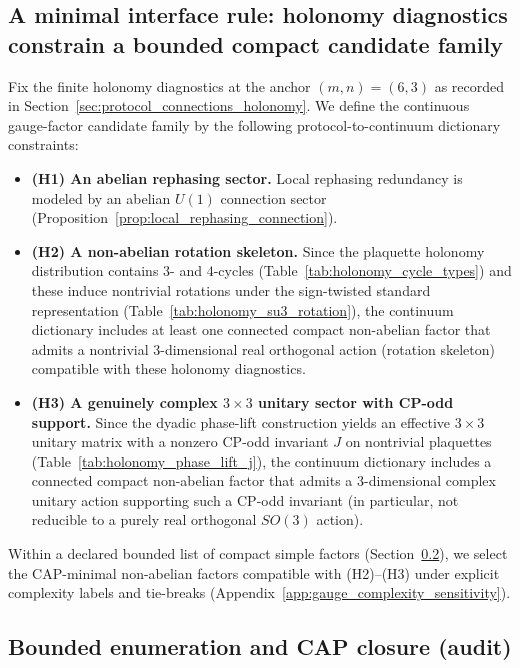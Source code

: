 \subsection{A minimal interface rule: holonomy diagnostics constrain a bounded compact candidate family}
\label{subsec:gauge3_interface_rule}

\begin{definition}
\label{def:holonomy_to_candidate_family_rule}
\InterfaceTag Fix the finite holonomy diagnostics at the anchor $(m,n)=(6,3)$ as recorded in Section~\ref{sec:protocol_connections_holonomy}.
We define the continuous gauge-factor candidate family by the following protocol-to-continuum dictionary constraints:
\begin{itemize}
  \item \textbf{(H1) An abelian rephasing sector.} Local rephasing redundancy is modeled by an abelian $U(1)$ connection sector (Proposition~\ref{prop:local_rephasing_connection}).
  \item \textbf{(H2) A non-abelian rotation skeleton.} Since the plaquette holonomy distribution contains $3$- and $4$-cycles (Table~\ref{tab:holonomy_cycle_types}) and these induce nontrivial rotations under the sign-twisted standard representation (Table~\ref{tab:holonomy_su3_rotation}), the continuum dictionary includes at least one connected compact non-abelian factor that admits a nontrivial $3$-dimensional real orthogonal action (rotation skeleton) compatible with these holonomy diagnostics.
  \item \textbf{(H3) A genuinely complex $3\times 3$ unitary sector with CP-odd support.} Since the dyadic phase-lift construction yields an effective $3\times 3$ unitary matrix with a nonzero CP-odd invariant $J$ on nontrivial plaquettes (Table~\ref{tab:holonomy_phase_lift_j}), the continuum dictionary includes a connected compact non-abelian factor that admits a $3$-dimensional complex unitary action supporting such a CP-odd invariant (in particular, not reducible to a purely real orthogonal $SO(3)$ action).
\end{itemize}
Within a declared bounded list of compact simple factors (Section~\ref{subsec:gauge3_bounded_enumeration}), we select the CAP-minimal non-abelian factors compatible with (H2)--(H3) under explicit complexity labels and tie-breaks (Appendix~\ref{app:gauge_complexity_sensitivity}).
\end{definition}

\subsection{Bounded enumeration and CAP closure (audit)}
\label{subsec:gauge3_bounded_enumeration}

